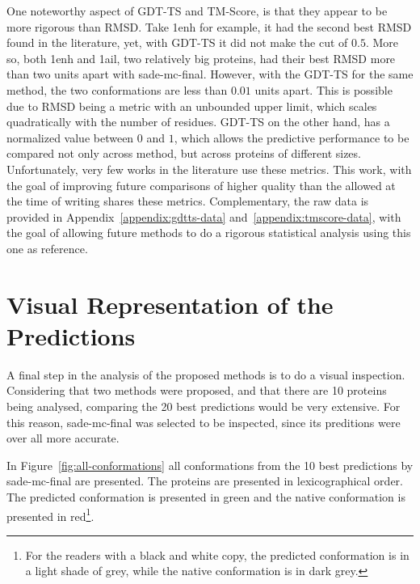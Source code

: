 One noteworthy aspect of GDT-TS and TM-Score, is that they appear to be more
rigorous than RMSD. Take 1enh for example, it had the second best RMSD found
in the literature, yet, with GDT-TS it did not make the cut of $0.5$. More so,
both 1enh and 1ail, two relatively big proteins, had their best RMSD more
than two units apart with sade-mc-final. However, with the GDT-TS for the same
method, the two conformations are less than $0.01$ units apart. This is possible
due to RMSD being a metric with an unbounded upper limit, which scales
quadratically with the number of residues. GDT-TS on the other hand, has a
normalized value between $0$ and $1$, which allows the predictive performance
to be compared not only across method, but across proteins of different sizes.
Unfortunately, very few works in the literature use these metrics. This work,
with the goal of improving future comparisons of higher quality than the allowed
at the time of writing shares these metrics. Complementary, the raw data is
provided in Appendix~\ref{appendix:gdtts-data} and~\ref{appendix:tmscore-data},
with the goal of allowing future methods to do a rigorous statistical analysis
using this one as reference.

\section{Visual Representation of the Predictions}
\label{sec:visual-analysis}

A final step in the analysis of the proposed methods is to do a visual
inspection. Considering that two methods were proposed, and that there are 10
proteins being analysed, comparing the 20 best predictions would be very
extensive. For this reason, sade-mc-final was selected to be inspected, since
its preditions were over all more accurate.



In Figure~\ref{fig:all-conformations} all conformations from the 10 best
predictions by sade-mc-final are presented. The proteins are presented in
lexicographical order. The predicted conformation is presented in green and the
native conformation is presented in red\footnote{For the readers with a black
and white copy, the predicted conformation is in a light shade of grey, while
the native conformation is in dark grey.}.

